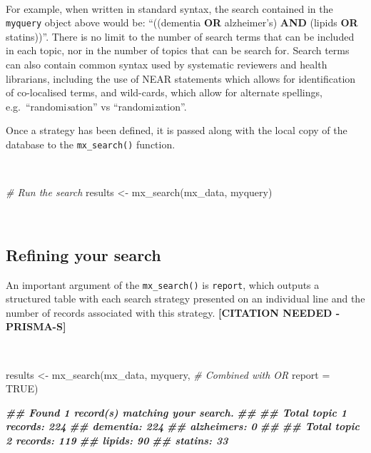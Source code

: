 \documentclass[a4paper, twoside]{templates/ociamthesis}
\newenvironment{Shaded}{\begin{snugshade}}{\end{snugshade}}
\newcommand{\AttributeTok}[1]{\textcolor[rgb]{0.77,0.63,0.00}{#1}}
\newcommand{\CommentTok}[1]{\textcolor[rgb]{0.56,0.35,0.01}{\textit{#1}}}
\newcommand{\ConstantTok}[1]{\textcolor[rgb]{0.00,0.00,0.00}{#1}}
\newcommand{\DocumentationTok}[1]{\textcolor[rgb]{0.56,0.35,0.01}{\textbf{\textit{#1}}}}
\newcommand{\FunctionTok}[1]{\textcolor[rgb]{0.00,0.00,0.00}{#1}}
\newcommand{\NormalTok}[1]{#1}
\newcommand{\OtherTok}[1]{\textcolor[rgb]{0.56,0.35,0.01}{#1}}
\renewenvironment{Shaded}
{
  \vspace{4pt}%
  \begin{snugshade}%
}{%
  \end{snugshade}%
  \vspace{4pt}%
}
\begin{document}
~

For example, when written in standard syntax, the search contained in the \texttt{myquery} object above would be: ``((dementia \textbf{OR} alzheimer's) \textbf{AND} (lipids \textbf{OR} statins))''. There is no limit to the number of search terms that can be included in each topic, nor in the number of topics that can be search for. Search terms can also contain common syntax used by systematic reviewers and health librarians, including the use of NEAR statements which allows for identification of co-localised terms, and wild-cards, which allow for alternate spellings, e.g.~``randomi\emph{s}ation'' vs ``randomi\emph{z}ation''.

Once a strategy has been defined, it is passed along with the local copy of the database to the \texttt{mx\_search()} function.

~

\begin{Shaded}
\begin{Highlighting}[]
\CommentTok{\# Run the search}
\NormalTok{results }\OtherTok{\textless{}{-}} \FunctionTok{mx\_search}\NormalTok{(mx\_data,}
\NormalTok{                     myquery)}
\end{Highlighting}
\end{Shaded}

~

\hypertarget{refining-your-search}{%
\subsection{Refining your search}\label{refining-your-search}}

An important argument of the \texttt{mx\_search()} is \texttt{report}, which outputs a structured table with each search strategy presented on an individual line and the number of records associated with this strategy. \textbf{{[}CITATION NEEDED - PRISMA-S{]}}

~

\begin{Shaded}
\begin{Highlighting}[]
\NormalTok{results  }\OtherTok{\textless{}{-}} \FunctionTok{mx\_search}\NormalTok{(mx\_data,}
\NormalTok{                      myquery, }\CommentTok{\# Combined with OR}
                      \AttributeTok{report =} \ConstantTok{TRUE}\NormalTok{)}
\end{Highlighting}
\end{Shaded}

\begin{Shaded}
\begin{Highlighting}[]
\DocumentationTok{\#\# Found 1 record(s) matching your search.}
\DocumentationTok{\#\# }
\DocumentationTok{\#\# Total topic 1 records: 224}
\DocumentationTok{\#\# dementia: 224}
\DocumentationTok{\#\# alzheimer\textquotesingle{}s: 0}
\DocumentationTok{\#\# }
\DocumentationTok{\#\# Total topic 2 records: 119}
\DocumentationTok{\#\# lipids: 90}
\DocumentationTok{\#\# statins: 33}
\end{Highlighting}
\end{Shaded}
\end{document}
